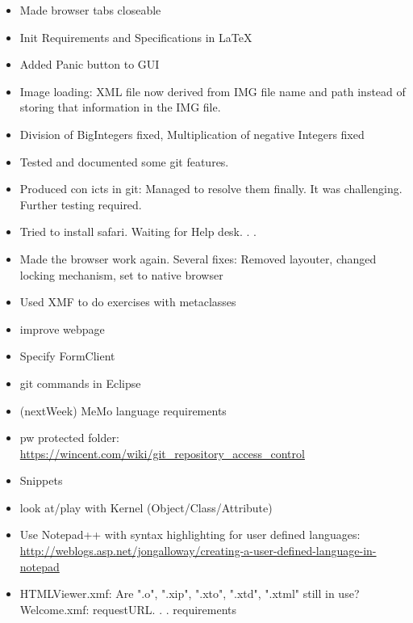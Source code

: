 \setcounter{section}{14}
\setcounter{subsection}{36}
\begin{itemize}
\item Made browser tabs closeable
\item Init Requirements and Specifications in LaTeX
\item Added Panic button to GUI
\item Image loading: XML file now derived from IMG file name and path instead of storing
that information in the IMG file.
\item Division of BigIntegers fixed, Multiplication of negative Integers fixed
\end{itemize}
\begin{itemize}
\item Tested and documented some git features.
\item Produced con
icts in git: Managed to resolve them finally. It was challenging. Further
testing required.
\item Tried to install safari. Waiting for Help desk. . .
\item Made the browser work again. Several fixes: Removed layouter, changed locking mechanism,
set to native browser
\end{itemize}
\begin{itemize}
\item Used XMF to do exercises with metaclasses
\end{itemize}
\begin{itemize}
\item improve webpage
\item Specify FormClient
\item git commands in Eclipse
\item (nextWeek) MeMo language requirements
\item pw protected folder: \url{https://wincent.com/wiki/git_repository_access_control}
\item Snippets
\item look at/play with Kernel (Object/Class/Attribute)
\item Use Notepad++ with syntax highlighting for user defined languages: \url{http://weblogs.asp.net/jongalloway/creating-a-user-defined-language-in-notepad}
\item HTMLViewer.xmf: Are ".o", ".xip", ".xto", ".xtd", ".xtml" still in use?
Welcome.xmf: requestURL. . .
requirements
\end{itemize}
